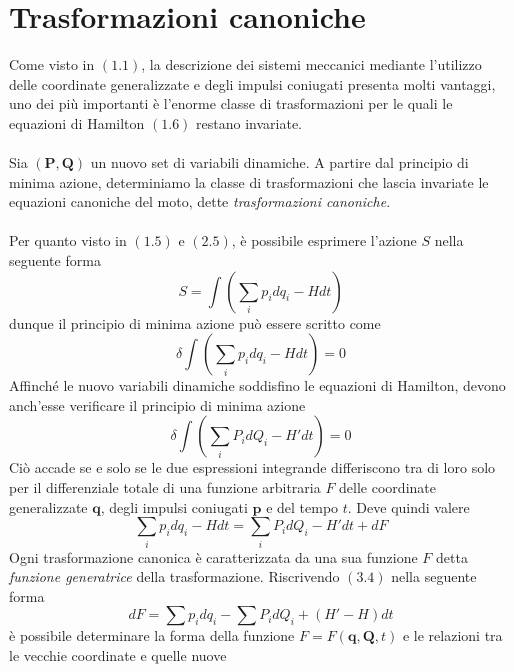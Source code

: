 \documentclass{article}
\begin{document}
\section{Trasformazioni canoniche}
Come visto in $(1.1)$, la descrizione dei sistemi meccanici mediante l'utilizzo delle coordinate generalizzate e degli impulsi coniugati presenta molti vantaggi, uno dei più importanti è l'enorme classe di trasformazioni per le quali le equazioni di Hamilton $(1.6)$ restano invariate. \\ \\
Sia $(\mathbf{P}, \mathbf{Q})$ un nuovo set di variabili dinamiche. A partire dal principio di minima azione, determiniamo la classe di trasformazioni che lascia invariate le equazioni canoniche del moto, dette \textit{trasformazioni canoniche}. \\ \\
Per quanto visto in $(1.5)$ e $(2.5)$, è possibile esprimere l'azione $S$ nella seguente forma
\begin{equation}
    S = \int \left( \sum_i p_idq_i - Hdt \right) \tag{3.1}
\end{equation}
dunque il principio di minima azione può essere scritto come
\begin{equation}
    \delta \int \left( \sum_i p_idq_i - Hdt \right) = 0 \tag{3.2}
\end{equation}
Affinché le nuovo variabili dinamiche soddisfino le equazioni di Hamilton, devono anch'esse verificare il principio di minima azione
\begin{equation}
    \delta \int \left( \sum_i P_idQ_i - H'dt \right) = 0 \tag{3.3}
\end{equation}
Ciò accade se e solo se le due espressioni integrande differiscono tra di loro solo per il differenziale totale di una funzione arbitraria $F$ delle coordinate generalizzate $\mathbf{q}$, degli impulsi coniugati $\mathbf{p}$ e del tempo $t$. Deve quindi valere
\begin{equation}
    \sum_i p_idq_i - Hdt = \sum_i P_idQ_i - H'dt  +dF \tag{3.4}
\end{equation}
Ogni trasformazione canonica è caratterizzata da una sua funzione $F$ detta \textit{funzione generatrice} della trasformazione.
Riscrivendo $(3.4)$ nella seguente forma
\begin{equation}
    dF = \sum p_i dq_i - \sum P_i dQ_i + (H' - H)dt \tag{3.5}
\end{equation}
è possibile determinare la forma della funzione $F = F(\mathbf{q}, \mathbf{Q}, t)$ e le relazioni tra le vecchie coordinate e quelle nuove
\end{document}
